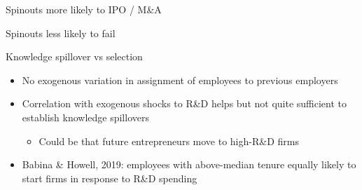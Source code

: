 \documentclass[english,usenames,dvipsnames]{beamer}
\begin{document}
\begin{frame}{Spinouts more likely to IPO / M\&A}
\begin{table}
\tiny
\centering

\caption{\footnotesize The regresssions above compare the \textbf{\alert{M\&A and IPO hazard rate}} in WSO4 spinouts, non-WSO4 spinouts and non-spinouts. The first regression uses no controls. The following three regressions in addition control for year effects, age effects, and / or cohort effects, in each case allowing the relevant effect to differ by State-NAICS4 combination. Standard errors are multi-way clustered at the state, NAICS4 and year levels.}
\end{table}
\end{frame}

\begin{frame}{Spinouts less likely to fail}
\begin{table}
\tiny
\centering

\caption{\footnotesize The regresssions above compare the \textbf{\alert{failure rate}} in WSO4 spinouts, non-WSO4 spinouts and non-spinouts. The first regression uses no controls. The following three regressions in addition control for year effects, age effects, and / or cohort effects, in each case allowing the relevant effect to differ by State-NAICS4 combination. Standard errors are multi-way clustered at the state, NAICS4 and year levels.}
\end{table}
\end{frame}

\begin{frame}{Knowledge spillover vs selection}
\begin{itemize}
	\item No exogenous variation in assignment of employees to previous employers 
	\item Correlation with exogenous shocks to R\&D helps but not quite sufficient to establish knowledge spillovers
	\begin{itemize}
		\item Could be that future entrepreneurs move to high-R\&D firms
	\end{itemize}
	\item Babina \& Howell, 2019: employees with above-median tenure equally likely to start firms in response to R\&D spending
\end{itemize}
\end{frame}
\end{document}
